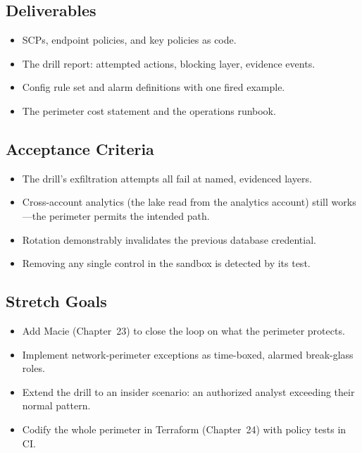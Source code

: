 \subsection*{Deliverables}
\begin{itemize}
    \item SCPs, endpoint policies, and key policies as code.
    \item The drill report: attempted actions, blocking layer, evidence events.
    \item Config rule set and alarm definitions with one fired example.
    \item The perimeter cost statement and the operations runbook.
\end{itemize}

\subsection*{Acceptance Criteria}
\begin{itemize}
    \item The drill's exfiltration attempts all fail at named, evidenced layers.
    \item Cross-account analytics (the lake read from the analytics account) still works---the perimeter permits the intended path.
    \item Rotation demonstrably invalidates the previous database credential.
    \item Removing any single control in the sandbox is detected by its test.
\end{itemize}

\subsection*{Stretch Goals}
\begin{itemize}
    \item Add Macie (Chapter~23) to close the loop on what the perimeter protects.
    \item Implement network-perimeter exceptions as time-boxed, alarmed break-glass roles.
    \item Extend the drill to an insider scenario: an authorized analyst exceeding their normal pattern.
    \item Codify the whole perimeter in Terraform (Chapter~24) with policy tests in CI.
\end{itemize}
